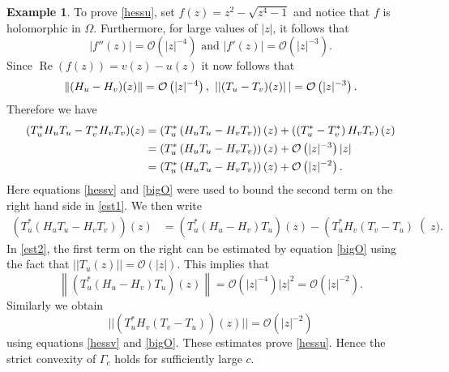 \documentclass[11pt]{amsart}
\renewcommand{\Re}{\operatorname{Re}}
\theoremstyle{definition}
\newtheorem{example}[thm]{Example}
\theoremstyle{remark}
\begin{document}
\begin{example}
To prove \eqref{hessu}, set $f(z) = z^2 - \sqrt{z^4 - 1}$ and notice that $f$ is holomorphic in $\Omega$. Furthermore,  for large values of $|z|$, it follows that $$|f''(z)| = \mathcal{O}\left(|z|^{-4}\right)\text{ and } |f'(z)| = \mathcal{O}\left(|z|^{-3}\right).$$ Since $\Re(f(z)) = v(z) - u(z)$ it now follows that
%
\begin{equation}\label{bigO}
\left\|(H_u - H_v)(z)\right\|= \mathcal{O}\left(|z|^{-4}\right), \hspace{0.05in} \left||(T_u - T_v)(z)\right|| = \mathcal{O}\left(|z|^{-3}\right).
\end{equation}
Therefore we have
\begin{align}\label{est1}
(T_u^{*}H_uT_u - T_v^{*}H_vT_v)(z) 
  &= \left(T_u^{*}\left(H_uT_u - H_vT_v\right)\right)(z) + \left(\left(T_u^{*} 
  - T_v^{*}\right)H_vT_v\right)(z) \\
  &= \left(T_u^{*}\left(H_uT_u - H_vT_v\right)\right)(z) 
  + \mathcal{O}\left(|z|^{-3}\right)|z|\notag\\
  &= \left(T_u^{*}\left(H_uT_u - H_vT_v\right)\right)(z) + \mathcal{O}\left(|z|^{-2}\right).\notag
\end{align}
Here equations \eqref{hessv} and \eqref{bigO} were used to bound the second term on the right hand side in \eqref{est1}. We then write 
\begin{align}\label{est2}
\left(T_u^{*}\left(H_uT_u - H_vT_v\right)\right)(z)&= \left(T_u^{*}\left(H_u-H_v\right)T_u\right)(z) - \left(T_u^{*}H_v\left(T_v - T_u\right)\right(z).
\end{align}
In \eqref{est2}, the first term on the right can be estimated by equation \eqref{bigO} using the fact that $||T_u(z)|| = \mathcal{O}\left(|z|\right)$. This implies that $$\left\|\left(T_u^{*}\left(H_u-H_v\right)T_u\right)(z)\right\| = \mathcal{O}\left(|z|^{-4}\right)|z|^2 = \mathcal{O}\left(|z|^{-2}\right).$$ 
Similarly we obtain 
$$||\left(T_u^{*}H_v\left(T_v - T_u\right)\right)(z)||=
\mathcal{O}\left(|z|^{-2}\right)$$ 
using equations \eqref{hessv} and \eqref{bigO}. These estimates  prove \eqref{hessu}. Hence the strict convexity of $\Gamma_c$ holds for sufficiently large $c$. 
\end{example}
\end{document}

